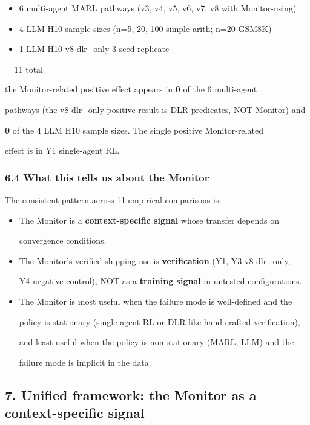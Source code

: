 \documentclass[
]{article}
\begin{document}
\begin{itemize}
\item
  6 multi-agent MARL pathways (v3, v4, v5, v6, v7, v8 with
  Monitor-using)
\item
  4 LLM H10 sample sizes (n=5, 20, 100 simple arith; n=20 GSM8K)
\item
  1 LLM H10 v8 dlr\_only 3-seed replicate
\end{itemize}

= 11 total

the Monitor-related positive effect appears in \textbf{0} of the 6
multi-agent

pathways (the v8 dlr\_only positive result is DLR predicates, NOT
Monitor) and

\textbf{0} of the 4 LLM H10 sample sizes. The single positive
Monitor-related

effect is in Y1 single-agent RL.

\subsubsection{6.4 What this tells us about the
Monitor}\label{what-this-tells-us-about-the-monitor}

The consistent pattern across 11 empirical comparisons is:

\begin{itemize}
\item
  The Monitor is a \textbf{context-specific signal} whose transfer
  depends on

  convergence conditions.
\item
  The Monitor's verified shipping use is \textbf{verification} (Y1, Y3
  v8 dlr\_only,

  Y4 negative control), NOT as a \textbf{training signal} in untested
  configurations.
\item
  The Monitor is most useful when the failure mode is well-defined and
  the

  policy is stationary (single-agent RL or DLR-like hand-crafted
  verification),

  and least useful when the policy is non-stationary (MARL, LLM) and the

  failure mode is implicit in the data.
\end{itemize}

\subsection{7. Unified framework: the Monitor as a context-specific
signal}\label{unified-framework-the-monitor-as-a-context-specific-signal}
\end{document}
